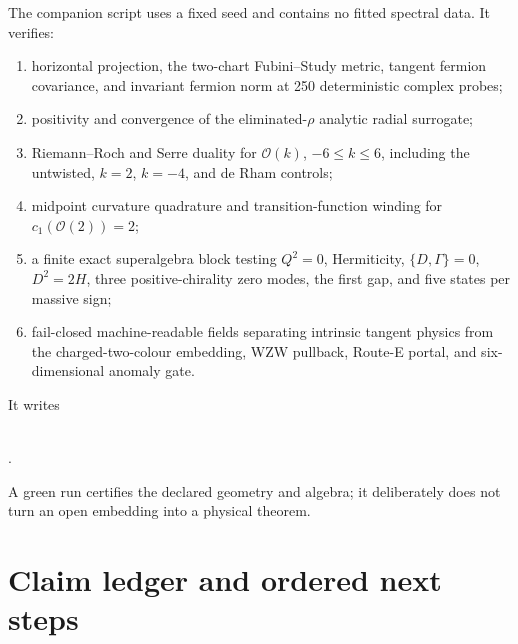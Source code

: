 \documentclass[11pt]{article}
\theoremstyle{definition}
\theoremstyle{remark}
\newcommand{\cO}{\mathcal O}
\begin{document}
The companion script
 uses a fixed seed and
contains no fitted spectral data.  It verifies:
\begin{enumerate}
\item horizontal projection, the two-chart Fubini--Study metric, tangent
  fermion covariance, and invariant fermion norm at 250 deterministic
  complex probes;
\item positivity and convergence of the eliminated-\(\rho\) analytic
  radial surrogate;
\item Riemann--Roch and Serre duality for \(\cO(k)\), \(-6\le k\le6\),
  including the untwisted, \(k=2\), \(k=-4\), and de Rham controls;
\item midpoint curvature quadrature and transition-function winding for
  \(c_1(\cO(2))=2\);
\item a finite exact superalgebra block testing \(Q^2=0\), Hermiticity,
  \(\{D,\Gamma\}=0\), \(D^2=2H\), three positive-chirality zero modes,
  the first gap, and five states per massive sign;
\item fail-closed machine-readable fields separating intrinsic tangent
  physics from the charged-two-colour embedding, WZW pullback, Route-E
  portal, and six-dimensional anomaly gate.
\end{enumerate}
It writes
\begin{center}
\small
{}\\
.
\end{center}
A green run certifies the declared geometry and algebra; it deliberately does
not turn an open embedding into a physical theorem.

\section{Claim ledger and ordered next steps}
\end{document}
